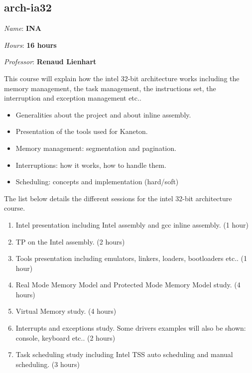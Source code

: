 \begin{multicols}{2}
%
%

\section{arch-ia32}

\textit{Name}: \textbf{INA}

\textit{Hours}: \textbf{16 hours}

\textit{Professor}: \textbf{Renaud Lienhart}

This course will explain how the intel 32-bit architecture works including
the memory management, the task management, the instructions set, the
interruption and exception management etc..

\begin{itemize}
  \item
    Generalities about the project and about inline assembly.
  \item
    Presentation of the tools used for Kaneton.
  \item
    Memory management: segmentation and pagination.
  \item
    Interruptions: how it works, how to handle them.
  \item
    Scheduling: concepts and implementation (hard/soft)
\end{itemize}

The list below details the different sessions for the intel 32-bit
architecture course.

\begin{enumerate}
  \item
    Intel presentation including Intel assembly and gcc inline assembly. (1 hour)
  \item
    TP on the Intel assembly. (2 hours)
  \item
    Tools presentation including emulators, linkers, loaders, bootloaders
    etc.. (1 hour)
  \item
    Real Mode Memory Model and Protected Mode Memory Model study. (4 hours)
  \item
    Virtual Memory study. (4 hours)
  \item
    Interrupts and exceptions study. Some drivers examples will also
    be shown: console, keyboard etc.. (2 hours)
  \item
    Task scheduling study including Intel TSS auto scheduling and
    manual scheduling. (3 hours)
\end{enumerate}




\end{multicols}
